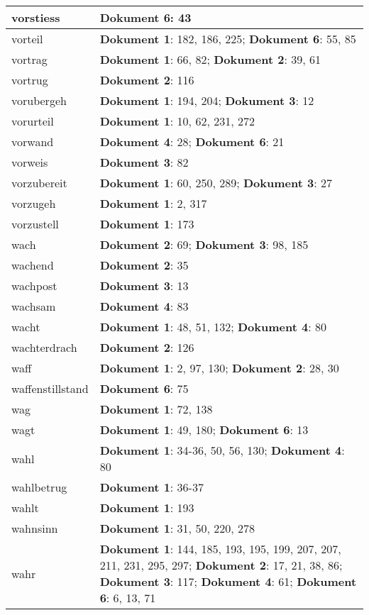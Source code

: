 \documentclass[a5paper]{article}
\begin{document}
\begin{longtable}[l]{|l|p{3in}|}
\hline
vorstiess & \textbf{Dokument 6}: 43 \\
\hline
vorteil & \textbf{Dokument 1}: 182, 186, 225; \textbf{Dokument 6}: 55, 85 \\
\hline
vortrag & \textbf{Dokument 1}: 66, 82; \textbf{Dokument 2}: 39, 61 \\
\hline
vortrug & \textbf{Dokument 2}: 116 \\
\hline
vorubergeh & \textbf{Dokument 1}: 194, 204; \textbf{Dokument 3}: 12 \\
\hline
vorurteil & \textbf{Dokument 1}: 10, 62, 231, 272 \\
\hline
vorwand & \textbf{Dokument 4}: 28; \textbf{Dokument 6}: 21 \\
\hline
vorweis & \textbf{Dokument 3}: 82 \\
\hline
vorzubereit & \textbf{Dokument 1}: 60, 250, 289; \textbf{Dokument 3}: 27 \\
\hline
vorzugeh & \textbf{Dokument 1}: 2, 317 \\
\hline
vorzustell & \textbf{Dokument 1}: 173 \\
\hline
wach & \textbf{Dokument 2}: 69; \textbf{Dokument 3}: 98, 185 \\
\hline
wachend & \textbf{Dokument 2}: 35 \\
\hline
wachpost & \textbf{Dokument 3}: 13 \\
\hline
wachsam & \textbf{Dokument 4}: 83 \\
\hline
wacht & \textbf{Dokument 1}: 48, 51, 132; \textbf{Dokument 4}: 80 \\
\hline
wachterdrach & \textbf{Dokument 2}: 126 \\
\hline
waff & \textbf{Dokument 1}: 2, 97, 130; \textbf{Dokument 2}: 28, 30 \\
\hline
waffenstillstand & \textbf{Dokument 6}: 75 \\
\hline
wag & \textbf{Dokument 1}: 72, 138 \\
\hline
wagt & \textbf{Dokument 1}: 49, 180; \textbf{Dokument 6}: 13 \\
\hline
wahl & \textbf{Dokument 1}: 34-36, 50, 56, 130; \textbf{Dokument 4}: 80 \\
\hline
wahlbetrug & \textbf{Dokument 1}: 36-37 \\
\hline
wahlt & \textbf{Dokument 1}: 193 \\
\hline
wahnsinn & \textbf{Dokument 1}: 31, 50, 220, 278 \\
\hline
wahr & \textbf{Dokument 1}: 144, 185, 193, 195, 199, 207, 207, 211, 231, 295, 297; \textbf{Dokument 2}: 17, 21, 38, 86; \textbf{Dokument 3}: 117; \textbf{Dokument 4}: 61; \textbf{Dokument 6}: 6, 13, 71 \\

\end{longtable}
\end{document}
